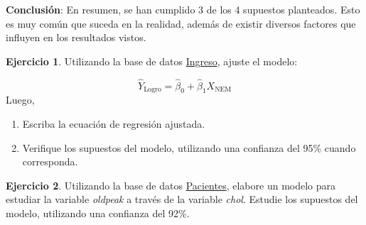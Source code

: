 \documentclass[
  11pt,
]{book}
\providecommand{\tightlist}{%
  \setlength{\itemsep}{0pt}\setlength{\parskip}{0pt}}
\theoremstyle{definition}
\theoremstyle{definition}
\theoremstyle{definition}
\newtheorem{exercise}{Ejercicio}[chapter]
\theoremstyle{definition}
\theoremstyle{remark}
\begin{document}
\textbf{Conclusión}: En resumen, se han cumplido 3 de los 4 supuestos planteados. Esto es muy común que suceda en la realidad, además de existir diversos factores que influyen en los resultados vistos.

\begin{exercise}

Utilizando la base de datos \hyperref[Ingreso]{Ingreso}, ajuste el modelo:

\[\widehat{Y}_{\text{Logro}} = \widehat{\beta}_0 + \widehat{\beta}_1X_{\text{NEM}}\]
Luego,

\begin{enumerate}
\def\labelenumi{\arabic{enumi}.}
\tightlist
\item
  Escriba la ecuación de regresión ajustada.
\item
  Verifique los supuestos del modelo, utilizando una confianza del 95\% cuando corresponda.
\end{enumerate}

\end{exercise}

\begin{exercise}
Utilizando la base de datos \hyperref[Pacientes]{Pacientes}, elabore un modelo para estudiar la variable \emph{oldpeak} a través de la variable \emph{chol}. Estudie los supuestos del modelo, utilizando una confianza del 92\%.
\end{exercise}
\end{document}
